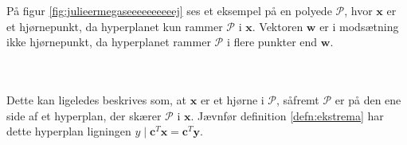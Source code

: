 \noindent
%
På figur \ref{fig:julieermegaseeeeeeeeeej} ses et eksempel på en polyede $\mathcal{P}$, hvor $\textbf{x}$ er et hjørnepunkt, da hyperplanet kun rammer $\mathcal{P}$ i $\mathbf{x}$. 
Vektoren $\textbf{w}$ er i modsætning ikke hjørnepunkt, da hyperplanet rammer $\mathcal{P}$ i flere punkter end $\mathbf{w}$.
%

\\\\
%
%
Dette kan ligeledes beskrives som, at $\mathbf{x}$ er et hjørne i $\mathcal{P}$, såfremt $\mathcal{P}$ er på den ene side af et hyperplan, der skærer $\mathcal{P}$ i $\mathbf{x}$. 
Jævnfør definition \ref{defn:ekstrema} har dette hyperplan ligningen $y \mid \mathbf{c}^T\mathbf{x}=\mathbf{c}^T\mathbf{y}.$